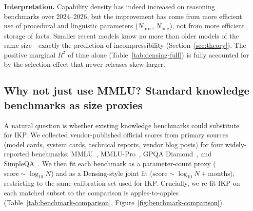 \documentclass[11pt]{article}
\begin{document}
\textbf{Interpretation.} Capability density has indeed increased on reasoning benchmarks over 2024--2026, but the improvement has come from more efficient use of procedural and linguistic parameters ($N_\mathrm{proc}, N_\mathrm{ling}$), not from more efficient storage of facts. Smaller recent models know no more than older models of the same size---exactly the prediction of incompressibility (Section~\ref{sec:theory}). The positive marginal $R^2$ of time alone (Table~\ref{tab:densing-full}) is fully accounted for by the selection effect that newer releases skew larger.

\subsection{Why not just use MMLU? Standard knowledge benchmarks as size proxies}
\label{sec:benchmark-comparison}

A natural question is whether existing knowledge benchmarks could substitute for IKP. We collected vendor-published official scores from primary sources (model cards, system cards, technical reports, vendor blog posts) for four widely-reported benchmarks: MMLU~\citep{hendrycks2021measuring}, MMLU-Pro~\citep{wang2024mmlupro}, GPQA Diamond~\citep{rein2023gpqa}, and SimpleQA~\citep{wei2024simpleqa}. We then fit each benchmark as a parameter-count proxy ($\text{score} \sim \log_{10} N$) and as a Densing-style joint fit ($\text{score} \sim \log_{10} N + \text{months}$), restricting to the same calibration set used for IKP. Crucially, we re-fit IKP on each matched subset so the comparison is apples-to-apples (Table~\ref{tab:benchmark-comparison}, Figure~\ref{fig:benchmark-comparison}).
\end{document}
